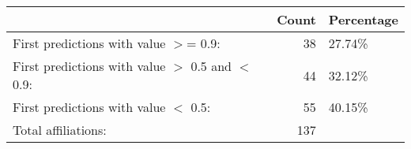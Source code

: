 \begin{tabular}{lrl}
\hline
                                               &   Count & Percentage   \\
\hline
 First predictions with value \ensuremath{>}= 0.9:          &      38 & 27.74\%       \\
 First predictions with value \ensuremath{>} 0.5 and \ensuremath{<} 0.9: &      44 & 32.12\%       \\
 First predictions with value \ensuremath{<} 0.5:           &      55 & 40.15\%       \\
 Total affiliations:                           &     137 &              \\
\hline
\end{tabular}